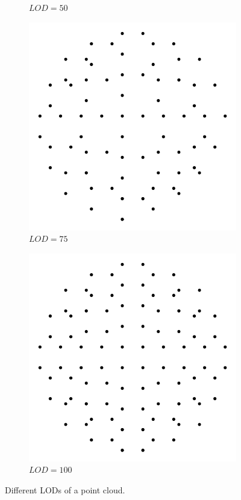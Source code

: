 \begin{figure}[h]
\begin{subfigure}{0.2\textwidth}
        \caption{$LOD = 50$}
    \end{subfigure}
    \begin{subfigure}{0.2\textwidth}
        \includegraphics[width=\textwidth]{lod-cloud-75.pdf}
        \caption{$LOD = 75$}
    \end{subfigure}
    \begin{subfigure}{0.2\textwidth}
        \includegraphics[width=\textwidth]{lod-cloud-100.pdf}
        \caption{$LOD = 100$}
    \end{subfigure}
    
    \caption{Different LODs of a point cloud.}
    \label{fig:cloud_lods}
\end{figure}

